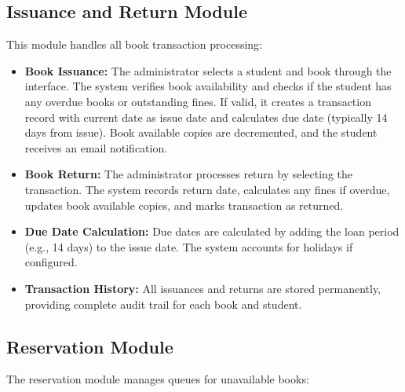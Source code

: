 \documentclass[12pt,a4paper]{report}
\begin{document}
\subsection{Issuance and Return Module}

This module handles all book transaction processing:

\begin{itemize}
    \item \textbf{Book Issuance:} The administrator selects a student and book through the interface. The system verifies book availability and checks if the student has any overdue books or outstanding fines. If valid, it creates a transaction record with current date as issue date and calculates due date (typically 14 days from issue). Book available copies are decremented, and the student receives an email notification.
    
    \item \textbf{Book Return:} The administrator processes return by selecting the transaction. The system records return date, calculates any fines if overdue, updates book available copies, and marks transaction as returned.
    
    \item \textbf{Due Date Calculation:} Due dates are calculated by adding the loan period (e.g., 14 days) to the issue date. The system accounts for holidays if configured.
    
    \item \textbf{Transaction History:} All issuances and returns are stored permanently, providing complete audit trail for each book and student.
\end{itemize}

\subsection{Reservation Module}

The reservation module manages queues for unavailable books:
\end{document}
